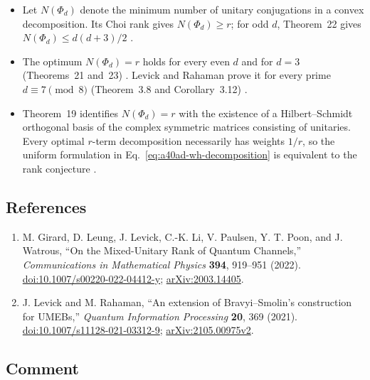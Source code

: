 \begin{itemize}
  \item Let $N(\Phi_d)$ denote the minimum number of unitary conjugations in a
convex decomposition. Its Choi rank gives $N(\Phi_d)\geq r$; for odd $d$,
Theorem~22 gives $N(\Phi_d)\leq d(d+3)/2$
.

  \item The optimum $N(\Phi_d)=r$ holds for every even $d$ and for $d=3$
(Theorems~21 and~23) .
Levick and Rahaman prove it for every prime $d\equiv7\pmod8$
(Theorem~3.8 and Corollary~3.12) .

  \item Theorem~19 identifies $N(\Phi_d)=r$ with the existence of a
Hilbert--Schmidt orthogonal basis of the complex symmetric matrices
consisting of unitaries. Every optimal $r$-term decomposition necessarily
has weights $1/r$, so the uniform formulation in
Eq.~\eqref{eq:a40ad-wh-decomposition} is equivalent to the rank conjecture
.
\end{itemize}

\subsection*{References}

\begin{enumerate}[label={},leftmargin=4.8em,labelsep=0.5em]
  \footnotesize
  \item[\textup{[GLL+22]}]\label{ref:a40ad-girard}
  M. Girard, D. Leung, J. Levick, C.-K. Li, V. Paulsen, Y. T. Poon,
and J. Watrous, ``On the Mixed-Unitary Rank of Quantum Channels,''
\emph{Communications in Mathematical Physics} \textbf{394}, 919--951 (2022).
\href{https://doi.org/10.1007/s00220-022-04412-y}{doi:10.1007/s00220-022-04412-y};
\href{https://arxiv.org/abs/2003.14405}{arXiv:2003.14405}.

  \item[\textup{[LR21]}]\label{ref:a40ad-levick}
  J. Levick and M. Rahaman, ``An extension of Bravyi--Smolin's
construction for UMEBs,'' \emph{Quantum Information Processing}
\textbf{20}, 369 (2021).
\href{https://doi.org/10.1007/s11128-021-03312-9}{doi:10.1007/s11128-021-03312-9};
\href{https://arxiv.org/abs/2105.00975v2}{arXiv:2105.00975v2}.
\end{enumerate}

\subsection*{Comment}

